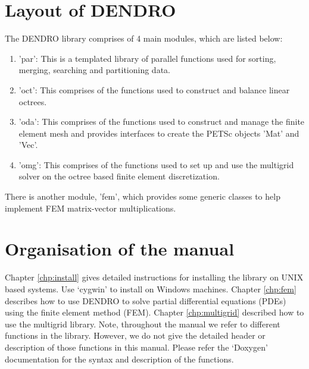 \documentclass[10pt,reqno,a4paper]{report}
\numberwithin{equation}{section}
\begin{document}
\section{Layout of DENDRO}
\label{sec:layout}
The DENDRO library comprises of 4 main modules, which are listed below:
\begin{enumerate}
\item 'par': This is a templated library of parallel functions used for sorting, merging, searching and partitioning data.
\item 'oct': This comprises of the functions used to construct and balance linear octrees.
\item 'oda': This comprises of the functions used to construct and manage the finite element mesh and provides interfaces to create the PETSc objects 'Mat' and 'Vec'. 
\item 'omg': This comprises of the functions used to set up and use the multigrid solver on the octree based finite element discretization.
\end{enumerate}
There is another module, 'fem', which provides some generic classes to help implement FEM matrix-vector multiplications.

\section{Organisation of the manual}
\label{sec:organisation}
Chapter \ref{chp:install} gives detailed instructions for installing the library on UNIX based systems. Use `cygwin' to install on Windows machines. Chapter \ref{chp:fem} describes how to use DENDRO to solve partial differential equations (PDEs) using the finite element method (FEM). Chapter \ref{chp:multigrid} described how to use the multigrid library. Note, throughout the manual we refer to different functions in the library. However, we do not give the detailed header or description of those functions in this manual. Please refer the `Doxygen' documentation for the syntax and description of the functions.
\end{document}
